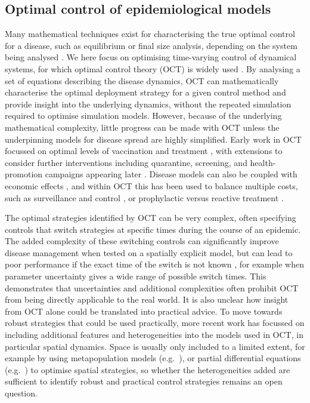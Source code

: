 \subsection*{Optimal control of epidemiological models}
\label{sec:OptimalControl}

Many mathematical techniques exist for characterising the true optimal control for a disease, such as equilibrium or final size analysis, depending on the system being analysed \citep{keeling_modeling_2007}. We here focus on optimising time-varying control of dynamical systems, for which optimal control theory (OCT) is widely used \citep{lenhart_optimal_2007}. By analysing a set of equations describing the disease dynamics, OCT can mathematically characterise the optimal deployment strategy for a given control method and provide insight into the underlying dynamics, without the repeated simulation required to optimise simulation models. However, because of the underlying mathematical complexity, little progress can be made with OCT unless the underpinning models for disease spread are highly simplified. Early work in OCT focussed on optimal levels of vaccination and treatment \citep{sethi_optimal_1978}, with extensions to consider further interventions including quarantine, screening, and health-promotion campaigns appearing later \citep{behncke_optimal_2000}. Disease models can also be coupled with economic effects \citep{perrings_merging_2014, epanchin-niell_economics_2017, cunniffe_cost-effective_2014}, and within OCT this has been used to balance multiple costs, such as surveillance and control \citep{ndeffo_mbah_balancing_2010}, or prophylactic versus reactive treatment \citep{brown_role_2011}.

The optimal strategies identified by OCT can be very complex, often specifying controls that switch strategies at specific times during the course of an epidemic. The added complexity of these switching controls can significantly improve disease management when tested on a spatially explicit model, but can lead to poor performance if the exact time of the switch is not known \citep{forster_optimizing_2007}, for example when parameter uncertainty gives a wide range of possible switch times. This demonstrates that uncertainties and additional complexities often prohibit OCT from being directly applicable to the real world. It is also unclear how insight from OCT alone could be translated into practical advice. To move towards robust strategies that could be used practically, more recent work has focussed on including additional features and heterogeneities into the models used in OCT, in particular spatial dynamics. Space is usually only included to a limited extent, for example by using metapopulation models (e.g.\ \citep{rowthorn_optimal_2009, ndeffo_mbah_resource_2011}), or partial differential equations (e.g.\ \citep{neilan_optimal_2011}) to optimise spatial strategies, so whether the heterogeneities added are sufficient to identify robust and practical control strategies remains an open question.

